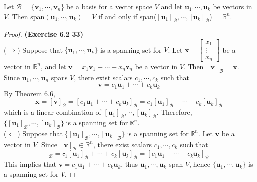 \begin{plaintheorem}
	Let $\mathcal{B} = \{ \textbf{v}_1, \cdots, \textbf{v}_n \}$ be a basis for a vector space $V$ and let $\textbf{u}_1, \cdots, \textbf{u}_k$ be vectors in $V$. Then span$( \textbf{u}_1, \cdots, \textbf{u}_k) = V$ if and only if span($[\textbf{u}_1]_\mathcal{B}, \cdots, [\textbf{u}_k]_\mathcal{B}$) = $\mathbb{R}^n$.
\end{plaintheorem}

\begin{proof}
	\textbf{(Exercise 6.2 33)} \\
	($\Rightarrow$) Suppose that $\{\textbf{u}_1, \cdots, \textbf{u}_k\}$ is a spanning set for $V$. Let $\textbf{x} = \begin{bmatrix}
		x_1 \\ \vdots \\ x_n
	\end{bmatrix}$ be a vector in $\mathbb{R}^n$, and let $\textbf{v} = x_1\textbf{v}_1 + \cdots + x_n\textbf{v}_n$ be a vector in $V$. Then $[\textbf{v}]_\mathcal{B} = \textbf{x}$. Since $\textbf{u}_1, \cdots, \textbf{u}_n$ spans $V$, there exist scalars $c_1, \cdots, c_k$ such that \begin{equation*}
		\textbf{v} = c_1\textbf{u}_1 + \cdots + c_k\textbf{u}_k
	\end{equation*} By Theorem 6.6, \begin{equation*}
		\textbf{x} = [\textbf{v}]_\mathcal{B} = [c_1\textbf{u}_1 + \cdots + c_k\textbf{u}_k]_\mathcal{B} = c_1[\textbf{u}_1]_\mathcal{B} + \cdots + c_k[\textbf{u}_k]_\mathcal{B}
	\end{equation*} which is a linear combination of $[\textbf{u}_1]_\mathcal{B}, \cdots, [\textbf{u}_k]_\mathcal{B}$. Therefore, $\{[\textbf{u}_1]_\mathcal{B}, \cdots, [\textbf{u}_k]_\mathcal{B}\}$ is a spanning set for  $\mathbb{R}^n$. \\
	
	($\Leftarrow$) Suppose that $\{[\textbf{u}_1]_\mathcal{B}, \cdots, [\textbf{u}_k]_\mathcal{B}\}$ is a spanning set for  $\mathbb{R}^n$. Let $\textbf{v}$ be a vector in $V$. Since $[\textbf{v}]_\mathcal{B} \in \mathbb{R}^n$, there exist scalars $c_1, \cdots, c_k$ such that \begin{equation*}
		[\textbf{v}]_\mathcal{B} = c_1[\textbf{u}_1]_\mathcal{B} + \cdots + c_k[\textbf{u}_k]_\mathcal{B} = [c_1\textbf{u}_1 + \cdots + c_k\textbf{u}_k]_\mathcal{B}
	\end{equation*} This implies that $\textbf{v} = c_1\textbf{u}_1 + \cdots + c_k\textbf{u}_k$, thus $\textbf{u}_1, \cdots, \textbf{u}_k$ span $V$, hence $\{\textbf{u}_1, \cdots, \textbf{u}_k\}$ is a spanning set for $V$.
\end{proof}

